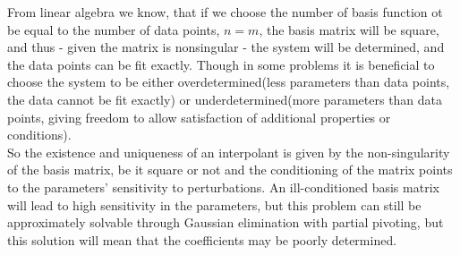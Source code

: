\documentclass[../../CompleteThesis2/Complete_2ndDraft.tex]{subfiles}
\begin{document}
	From linear algebra we know, that if we choose the number of basis function ot be equal to the number of data points, $n=m$, the basis matrix will be square, and thus - given the matrix is nonsingular - the system will be determined, and the data points can be fit exactly. Though in some problems it is beneficial to choose the system to be either overdetermined(less parameters than data points, the data cannot be fit exactly) or underdetermined(more parameters than data points, giving freedom to allow satisfaction of additional properties or conditions).\\ 
	So the existence and uniqueness of an interpolant is given by the non-singularity of the basis matrix, be it square or not and the conditioning of the matrix points to the parameters' sensitivity to perturbations. An ill-conditioned basis matrix will lead to high sensitivity in the parameters, but this problem can still be approximately solvable through Gaussian elimination with partial pivoting, but this solution will mean that the coefficients may be poorly determined.
	
\end{document}
